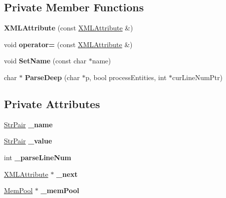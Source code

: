 \subsection*{Private Member Functions}
\begin{DoxyCompactItemize}
\item 
\mbox{\label{classtinyxml2_1_1XMLAttribute_a423410d8fb1b94f4514e34abf5432457}} 
{\bfseries X\+M\+L\+Attribute} (const \mbox{\hyperlink{classtinyxml2_1_1XMLAttribute}{X\+M\+L\+Attribute}} \&)
\item 
\mbox{\label{classtinyxml2_1_1XMLAttribute_a38e1d174a975bab27a70b4032e39a257}} 
void {\bfseries operator=} (const \mbox{\hyperlink{classtinyxml2_1_1XMLAttribute}{X\+M\+L\+Attribute}} \&)
\item 
\mbox{\label{classtinyxml2_1_1XMLAttribute_a469c2363600007f49e62a8048a362d57}} 
void {\bfseries Set\+Name} (const char $\ast$name)
\item 
\mbox{\label{classtinyxml2_1_1XMLAttribute_a6759fed9f17242de6be926b4e2e3611c}} 
char $\ast$ {\bfseries Parse\+Deep} (char $\ast$p, bool process\+Entities, int $\ast$cur\+Line\+Num\+Ptr)
\end{DoxyCompactItemize}
\subsection*{Private Attributes}
\begin{DoxyCompactItemize}
\item 
\mbox{\label{classtinyxml2_1_1XMLAttribute_a80850208963b536e9254a7fa1d4abe67}} 
\mbox{\hyperlink{classtinyxml2_1_1StrPair}{Str\+Pair}} {\bfseries \+\_\+name}
\item 
\mbox{\label{classtinyxml2_1_1XMLAttribute_abcf5c9b7f040ed71ed2a66557584b5b0}} 
\mbox{\hyperlink{classtinyxml2_1_1StrPair}{Str\+Pair}} {\bfseries \+\_\+value}
\item 
\mbox{\label{classtinyxml2_1_1XMLAttribute_a3ccce78440ebad696e6958cb51aead9e}} 
int {\bfseries \+\_\+parse\+Line\+Num}
\item 
\mbox{\label{classtinyxml2_1_1XMLAttribute_a3bbf00f77131a8e83d648d32d090c564}} 
\mbox{\hyperlink{classtinyxml2_1_1XMLAttribute}{X\+M\+L\+Attribute}} $\ast$ {\bfseries \+\_\+next}
\item 
\mbox{\label{classtinyxml2_1_1XMLAttribute_ac0a1130568dd9e985dd7753ae44fcdbf}} 
\mbox{\hyperlink{classtinyxml2_1_1MemPool}{Mem\+Pool}} $\ast$ {\bfseries \+\_\+mem\+Pool}
\end{DoxyCompactItemize}
